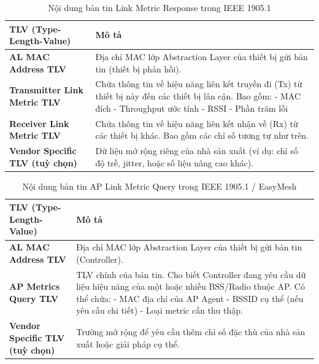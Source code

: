 \begin{table}[ht]
\centering
\caption{Nội dung bản tin Link Metric Response trong IEEE 1905.1}
\begin{tabular}{|>{\raggedright\arraybackslash}m{5cm}|>{\raggedright\arraybackslash}m{8cm}|}
\hline
\textbf{TLV (Type-Length-Value)} & \textbf{Mô tả} \\
\hline
\textbf{AL MAC Address TLV} & Địa chỉ MAC lớp Abstraction Layer của thiết bị gửi bản tin (thiết bị phản hồi). \\
\hline
\textbf{Transmitter Link Metric TLV} & Chứa thông tin về hiệu năng liên kết truyền đi (Tx) từ thiết bị này đến các thiết bị lân cận. Bao gồm: \newline
- MAC đích \newline
- Throughput ước tính \newline
- RSSI \newline
- Phần trăm lỗi \\
\hline
\textbf{Receiver Link Metric TLV} & Chứa thông tin về hiệu năng liên kết nhận về (Rx) từ các thiết bị khác. Bao gồm các chỉ số tương tự như trên. \\
\hline
\textbf{Vendor Specific TLV (tuỳ chọn)} & Dữ liệu mở rộng riêng của nhà sản xuất (ví dụ: chỉ số độ trễ, jitter, hoặc số liệu nâng cao khác). \\
\hline
\end{tabular}
\end{table}

\begin{table}[ht]
\centering
\caption{Nội dung bản tin AP Link Metric Query trong IEEE 1905.1 / EasyMesh}
\begin{tabular}{|>{\raggedright\arraybackslash}m{5cm}|>{\raggedright\arraybackslash}m{8cm}|}
\hline
\textbf{TLV (Type-Length-Value)} & \textbf{Mô tả} \\
\hline
\textbf{AL MAC Address TLV} & Địa chỉ MAC lớp Abstraction Layer của thiết bị gửi bản tin (Controller). \\
\hline
\textbf{AP Metrics Query TLV} & TLV chính của bản tin. Cho biết Controller đang yêu cầu dữ liệu hiệu năng của một hoặc nhiều BSS/Radio thuộc AP. \newline
Có thể chứa: \newline
- MAC địa chỉ của AP Agent \newline
- BSSID cụ thể (nếu yêu cầu chi tiết) \newline
- Loại metric cần thu thập. \\
\hline
\textbf{Vendor Specific TLV (tuỳ chọn)} & Trường mở rộng để yêu cầu thêm chỉ số đặc thù của nhà sản xuất hoặc giải pháp cụ thể. \\
\hline
\end{tabular}
\end{table}

